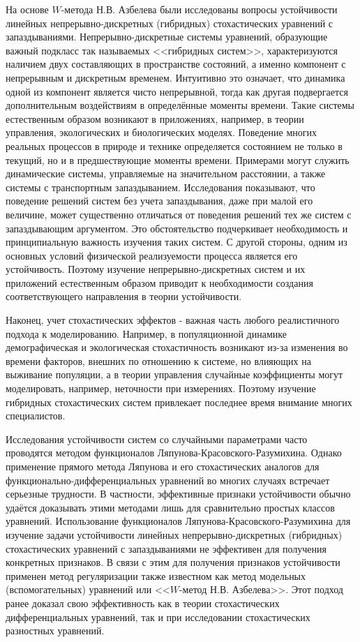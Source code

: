 На основе $W$-метода Н.В. Азбелева были исследованы вопросы устойчивости линейных непрерывно-дискретных (гибридных)
стохастических уравнений с запаздываниями. Непрерывно-дискретные системы уравнений, образующие важный подкласс так называемых <<гибридных систем>>, характеризуются наличием двух составляющих в пространстве состояний, а именно компонент с непрерывным и дискретным временем. Интуитивно это означает, что динамика одной из компонент является чисто непрерывной, тогда как другая подвергается дополнительным воздействиям в определённые моменты времени. Такие системы естественным образом возникают в приложениях, например, в теории управления, экологических и биологических моделях. Поведение многих реальных процессов в природе и технике определяется состоянием не только в текущий, но и в предшествующие моменты времени. Примерами могут служить динамические системы, управляемые
на значительном расстоянии, а также системы с транспортным запаздыванием. Исследования показывают, что поведение решений систем
без учета запаздывания, даже при малой его величине, может существенно отличаться от поведения решений тех же систем с
запаздывающим аргументом. Это обстоятельство подчеркивает необходимость и принципиальную важность изучения таких систем. С
другой стороны, одним из основных условий физической реализуемости процесса является его устойчивость. Поэтому изучение непрерывно-дискретных
систем и их приложений естественным образом приводит к необходимости создания соответствующего направления в теории устойчивости.

Наконец, учет стохастических эффектов - важная часть любого реалистичного подхода к моделированию. Например, в популяционной
динамике демографическая и экологическая стохастичность возникают из-за изменения во времени факторов, внешних по отношению к системе,
но влияющих на выживание популяции, а в теории управления случайные коэффициенты могут моделировать, например, неточности при
измерениях. Поэтому изучение гибридных стохастических систем привлекает последнее время внимание многих специалистов.

Исследования устойчивости систем со случайными параметрами часто проводятся методом функционалов Ляпунова-Красовского-Разумихина.
Однако применение прямого метода Ляпунова и его стохастических аналогов для функционально-дифференциальных уравнений во
многих случаях встречает серьезные трудности. В частности, эффективные признаки устойчивости обычно удаётся доказывать этими
методами лишь для сравнительно простых классов уравнений.
Использование функционалов Ляпунова-Красовского-Разумихина для изучение задачи устойчивости линейных непрерывно-дискретных (гибридных)
стохастических уравнений с запаздываниями не эффективен для получения конкретных признаков. В связи с этим для получения признаков устойчивости применен метод регуляризации также известном как метод модельных (вспомогательных) уравнений или <<$W$-метод Н.В. Азбелева>>. Этот подход ранее доказал
свою эффективность как в теории стохастических дифференциальных уравнений, так и при исследовании стохастических разностных
уравнений.  

